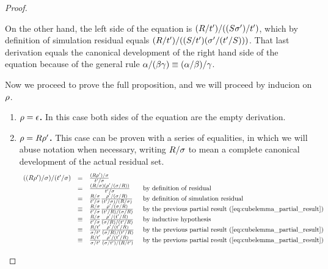 \begin{proof}
\begin{enumerate}
    On the other hand, the left side of the equation is $(R / t') / ((S \sigma') / t')$,
    which by definition of simulation residual equals
    $(R / t') / ((S / t') (\sigma' / (t' / S)))$.
    That last derivation equals the canonical development of the
    right hand side of the equation because of the general
    rule $\alpha / (\beta \gamma) \equiv (\alpha / \beta) / \gamma$.
\end{enumerate}

Now we proceed to prove the full proposition, and we will proceed by inducion on $\rho$.
\begin{enumerate}
  \item {\bf $\rho = \epsilon$.} In this case both sides of the equation are the empty derivation.
  \item {\bf $\rho = R \rho'$.} This case can be proven with a series of equalities,
    in which we will abuse notation when necessary, writing $R / \sigma$ to mean a complete canonical development of the actual residual set.
    \[
      \begin{array}{rcll}
      ((R \rho')/\sigma)/(t'/\sigma)
        & = & \frac{(R \rho')/\sigma}{t'/\sigma} \\
        & = & \frac{(R / \sigma) (\rho' / (\sigma / R))}{t'/\sigma} & \text{ by definition of residual} \\
        & = & \frac{R / \sigma}{t' / \sigma} \frac{\rho' / (\sigma / R)}{(t' / \sigma) / (R / \sigma)} & \text{ by definition of simulation residual} \\
      & \equiv & \frac{R / \sigma}{t' / \sigma} \frac{\rho' / (\sigma / R)}{(t' / R) / (\sigma / R)} & \text{ by the previous partial result } (\ref{eq:cubelemma_partial_result}) \\
        & \equiv & \frac{R / \sigma}{t' / \sigma} \frac{\rho' / (t' / R)}{(\sigma / R) / (t' / R)} & \text{ by inductive hypothesis} \\
        & \equiv & \frac{R / t'}{\sigma / t'} \frac{\rho' / (t' / R)}{(\sigma / R) / (t' / R)} & \text{ by the previous partial result } (\ref{eq:cubelemma_partial_result}) \\
        & \equiv & \frac{R / t'}{\sigma / t'} \frac{\rho' / (t' / R)}{(\sigma / t') / (R / t')} & \text{ by the previous partial result } (\ref{eq:cubelemma_partial_result}) \\

\end{array}\]
\end{enumerate}
\end{proof}
